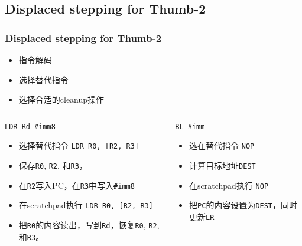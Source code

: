 \documentclass[cjk]{beamer}  %
\begin{document}
\begin{CJK}{UTF8}{gbsn}
{\begin{overprint}
  \end{overprint}

}

\subsection{Displaced stepping for Thumb-2}
\begin{frame}[fragile]
  \frametitle{Displaced stepping for Thumb-2}

  \begin{itemize}
  \item 指令解码
  \item 选择替代指令
  \item 选择合适的cleanup操作
  \end{itemize}

  \begin{columns}
    \column{7cm}
    \begin{overprint}
      \begin{block}{\texttt{LDR Rd \#imm8}}
        \begin{itemize}
        \item 选择替代指令 \texttt{LDR R0, [R2, R3]}
        \item 保存\texttt{R0}, \texttt{R2}, 和\texttt{R3}，
        \item 在\texttt{R2}写入PC，在\texttt{R3}中写入\texttt{\#imm8}
        \item 在scratchpad执行 \texttt{LDR R0, [R2, R3]}
        \item 把\texttt{R0}的内容读出，写到\texttt{Rd}，恢复\texttt{R0}, \texttt{R2}, 和\texttt{R3}。
        \end{itemize}

      \end{block}
    \end{overprint}

    \column{4.5cm}
    \begin{overprint}
      \begin{block}{\texttt{BL \#imm}}
        \begin{itemize}
        \item 选在替代指令 \texttt{NOP}
        \item 计算目标地址\texttt{DEST}
        \item 在scratchpad执行 \texttt{NOP}
        \item 把\texttt{PC}的内容设置为\texttt{DEST}，同时更新\texttt{LR}
        \end{itemize}
      \end{block}
    \end{overprint}
  \end{columns} 
\end{frame}


\end{CJK}
\end{document}
